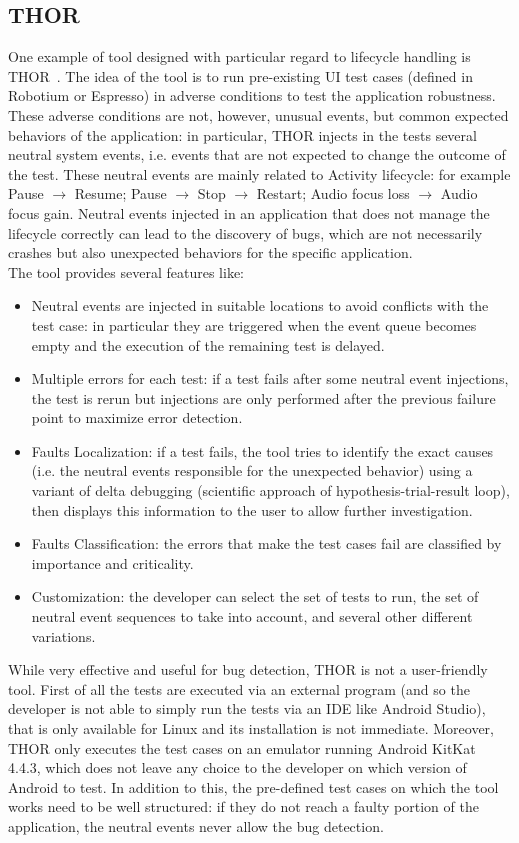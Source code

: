 \documentclass[11pt,a4paper,notitlepage]{article}
\begin{document}
\subsection{THOR}
One example of tool designed with particular regard to lifecycle handling is THOR~\cite{Adamsen:2015:SEA:2771783.2771786}. The idea of the tool is to run pre-existing UI test cases (defined in Robotium or Espresso) in adverse conditions to test the application robustness. These adverse conditions are not, however, unusual events, but common expected behaviors of the application: in particular, THOR injects in the tests several neutral system events, i.e. events that are not expected to change the outcome of the test. These neutral events are mainly related to Activity lifecycle: for example Pause $\rightarrow$ Resume; Pause $\rightarrow$ Stop $\rightarrow$ Restart; Audio
focus loss $\rightarrow$ Audio focus gain. Neutral events injected in an application that does not manage the lifecycle correctly can lead to the discovery of bugs, which are not necessarily crashes but also unexpected behaviors for the specific application.\medskip \\
The tool provides several features like:
\begin{itemize}
	\item Neutral events are injected in suitable locations to avoid conflicts with the test case: in particular they are triggered when the event queue becomes empty and the execution of the remaining test is delayed.
	\item Multiple errors for each test: if a test fails after some neutral event injections, the test is rerun but injections are only performed after the previous failure point to maximize error detection.
	\item Faults Localization: if a test fails, the tool tries to identify the exact causes (i.e. the neutral events responsible for the unexpected behavior) using a variant of delta debugging (scientific approach of hypothesis-trial-result loop), then displays this information to the user to allow further investigation.
	\item Faults Classification: the errors that make the test cases fail are classified by importance and criticality.
	\item Customization: the developer can select the set of tests to run,
the set of neutral event sequences to take into account, and
several other different variations.
\end{itemize}
While very effective and useful for bug detection, THOR is not a user-friendly tool. First of all the tests are executed via an external program (and so the developer is not able to simply run the tests via an IDE like Android Studio), that is only available for Linux and its installation is not immediate. Moreover, THOR only executes the test cases on an emulator running Android KitKat 4.4.3, which does not leave any choice to the developer on which version of Android to test. In addition to this, the pre-defined test cases on which the tool works need to be well structured: if they do not reach a faulty portion of the application, the neutral events never allow the bug detection.
\end{document}
